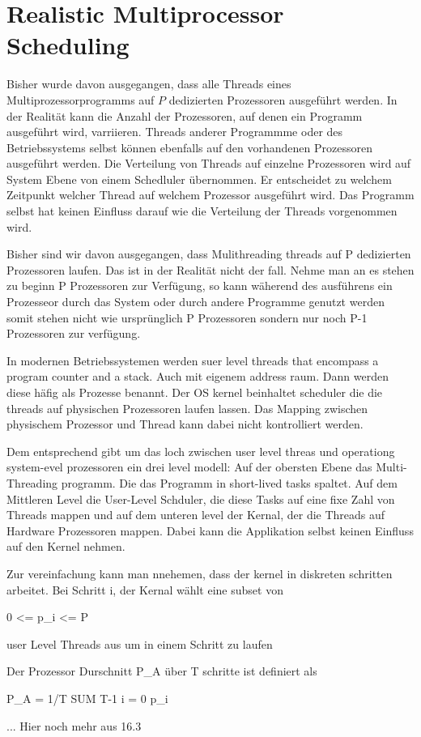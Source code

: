 \section{Realistic Multiprocessor Scheduling}


Bisher wurde davon ausgegangen, dass alle Threads eines Multiprozessorprogramms auf $P$ dedizierten Prozessoren ausgeführt werden. In der Realität kann die Anzahl der Prozessoren, auf denen ein Programm ausgeführt wird, varriieren. Threads anderer Programmme oder des Betriebssystems selbst können ebenfalls auf den vorhandenen Prozessoren ausgeführt werden. Die Verteilung von Threads auf einzelne Prozessoren wird auf System Ebene von einem Schedluler übernommen. Er entscheidet zu welchem Zeitpunkt welcher Thread auf welchem Prozessor ausgeführt wird. Das Programm selbst hat keinen Einfluss darauf wie die Verteilung der Threads vorgenommen wird.





Bisher sind wir davon ausgegangen, dass Mulithreading threads auf P dedizierten Prozessoren laufen. Das ist in der Realität nicht der fall. Nehme man an es stehen zu beginn P Prozessoren zur Verfügung, so kann wäherend des ausführens ein Prozesseor durch das System oder durch andere Programme genutzt werden somit stehen nicht wie ursprünglich P Prozessoren sondern nur noch P-1 Prozessoren zur verfügung.

In modernen Betriebssystemen werden suer level threads that encompass a program counter and a stack. Auch mit eigenem address raum. Dann werden diese häfig als Prozesse benannt. Der OS kernel beinhaltet scheduler die die threads auf physischen Prozessoren laufen lassen. Das Mapping zwischen physischem Prozessor und Thread kann dabei nicht kontrolliert werden.

Dem entsprechend gibt um das loch zwischen user level threas und operationg system-evel prozessoren ein drei level modell: Auf der obersten Ebene das Multi-Threading programm. Die das Programm in short-lived tasks spaltet. Auf dem Mittleren Level die User-Level Schduler, die diese Tasks auf eine fixe Zahl von Threads mappen und auf dem unteren level der Kernal, der die Threads auf Hardware Prozessoren  mappen. Dabei kann die Applikation selbst keinen Einfluss auf den Kernel nehmen. 

Zur vereinfachung kann man nnehemen, dass der kernel in diskreten schritten arbeitet. Bei Schritt i, der Kernal wählt eine subset von

0 <= p_i <= P

user Level Threads aus um in einem Schritt zu laufen

Der Prozessor Durschnitt P_A
über T schritte ist definiert als

P_A = 1/T SUM T-1 i = 0 p_i

... Hier noch mehr aus 16.3